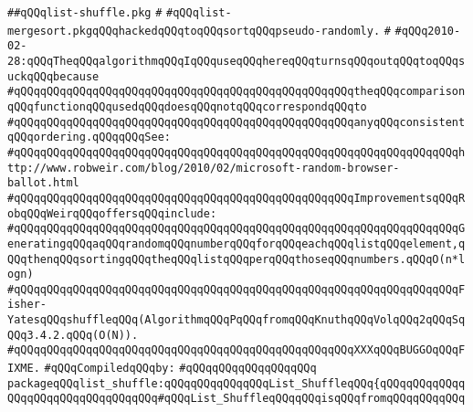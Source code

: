 \label{src/lib/src/list-shuffle.pkg}
\verb|##qQQqlist-shuffle.pkg|\newline
\verb|#|\newline
\verb|#qQQqlist-mergesort.pkgqQQqhackedqQQqtoqQQqsortqQQqpseudo-randomly.|\newline
\verb|#|\newline
\verb|#qQQq2010-02-28:qQQqTheqQQqalgorithmqQQqIqQQquseqQQqhereqQQqturnsqQQqoutqQQqtoqQQqsuckqQQqbecause|\newline
\verb|#qQQqqQQqqQQqqQQqqQQqqQQqqQQqqQQqqQQqqQQqqQQqqQQqqQQqtheqQQqcomparisonqQQqfunctionqQQqusedqQQqdoesqQQqnotqQQqcorrespondqQQqto|\newline
\verb|#qQQqqQQqqQQqqQQqqQQqqQQqqQQqqQQqqQQqqQQqqQQqqQQqqQQqanyqQQqconsistentqQQqordering.qQQqqQQqSee:|\newline
\verb|#qQQqqQQqqQQqqQQqqQQqqQQqqQQqqQQqqQQqqQQqqQQqqQQqqQQqqQQqqQQqqQQqqQQqhttp://www.robweir.com/blog/2010/02/microsoft-random-browser-ballot.html|\newline
\verb|#qQQqqQQqqQQqqQQqqQQqqQQqqQQqqQQqqQQqqQQqqQQqqQQqqQQqImprovementsqQQqRobqQQqWeirqQQqoffersqQQqinclude:|\newline
\verb|#qQQqqQQqqQQqqQQqqQQqqQQqqQQqqQQqqQQqqQQqqQQqqQQqqQQqqQQqqQQqqQQqqQQqGeneratingqQQqaqQQqrandomqQQqnumberqQQqforqQQqeachqQQqlistqQQqelement,qQQqthenqQQqsortingqQQqtheqQQqlistqQQqperqQQqthoseqQQqnumbers.qQQqO(n*logn)|\newline
\verb|#qQQqqQQqqQQqqQQqqQQqqQQqqQQqqQQqqQQqqQQqqQQqqQQqqQQqqQQqqQQqqQQqqQQqFisher-YatesqQQqshuffleqQQq(AlgorithmqQQqPqQQqfromqQQqKnuthqQQqVolqQQq2qQQqSqQQq3.4.2.qQQq(O(N)).|\newline
\verb|#qQQqqQQqqQQqqQQqqQQqqQQqqQQqqQQqqQQqqQQqqQQqqQQqqQQqXXXqQQqBUGGOqQQqFIXME.|\newline
\newline
\verb|#qQQqCompiledqQQqby:|\newline
\verb|#qQQqqQQqqQQqqQQqqQQq|\newline
\newline
\newline
\newline
\newline
\newline
\newline
\verb|packageqQQqlist_shuffle:qQQqqQQqqQQqqQQqList_ShuffleqQQq{qQQqqQQqqQQqqQQqqQQqqQQqqQQqqQQqqQQq#qQQqList_ShuffleqQQqqQQqisqQQqfromqQQqqQQqqQQq|\newline
